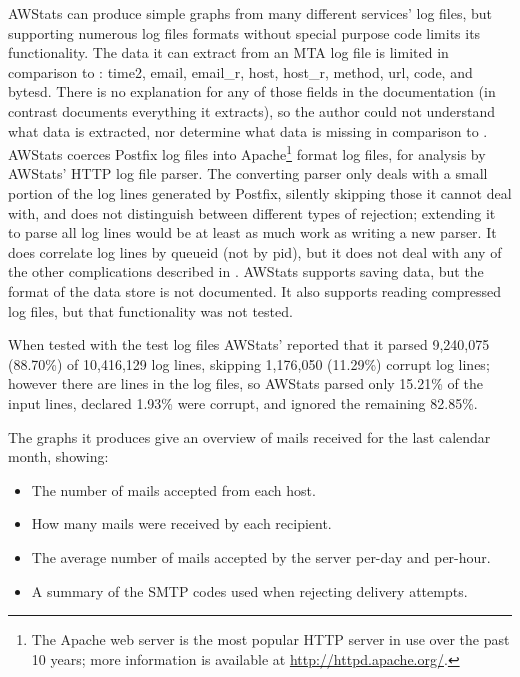 AWStats can produce simple graphs from many different services' log files,
but supporting numerous log files formats without special purpose code
limits its functionality.  The data it can extract from an \gls{MTA} log
file is limited in comparison to \parsername{}: time2, email, email\_r,
host, host\_r, method, url, code, and bytesd.  There is no explanation for
any of those fields in the documentation (in contrast \parsername{}
documents everything it extracts), so the author could not understand what
data is extracted, nor determine what data is missing in comparison to
\parsername{}.  AWStats coerces Postfix log files into Apache\footnote{The
Apache web server is the most popular HTTP server in use over the past 10
years; more information is available at \url{http://httpd.apache.org/}.}
format log files, for analysis by AWStats' HTTP log file parser.  The
converting parser only deals with a small portion of the log lines
generated by Postfix, silently skipping those it cannot deal with, and does
not distinguish between different types of rejection; extending it to parse
all log lines would be at least as much work as writing a new parser.  It
does correlate log lines by queueid (not by pid), but it does not deal with
any of the other complications described in .
AWStats supports saving data, but the format of the data store is not
documented.  It also supports reading compressed log files, but that
functionality was not tested.

When tested with the \numberOFlogFILES{} test log files AWStats' reported
that it parsed 9,240,075 (88.70\%) of 10,416,129 log lines, skipping
1,176,050 (11.29\%) corrupt log lines; however there are
\numberOFlogLINES{} lines in the \numberOFlogFILES{} log files, so AWStats
parsed only 15.21\% of the input lines, declared 1.93\% were corrupt, and
ignored the remaining 82.85\%.

The graphs it produces give an overview of mails received for the last
calendar month, showing:

\begin{itemize}

    \item The number of mails accepted from each host.

    \item How many mails were received by each recipient.

    \item The average number of mails accepted by the server per-day and
        per-hour.

    \item A summary of the \gls{SMTP} codes used when rejecting delivery
        attempts.

\end{itemize}

